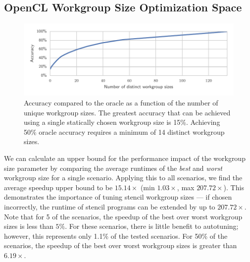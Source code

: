 \documentclass[nonatbib,preprint,nocopyrightspace,9pt]{sigplanconf}
\begin{document}
\subsection{OpenCL Workgroup Size Optimization Space}

\begin{figure}
\centering
\includegraphics[width=\columnwidth]{img/num_params_oracle.pdf}
\caption{%
  Accuracy compared to the oracle as a function of the number of
  unique workgroup sizes. The greatest accuracy that can be achieved
  using a single statically chosen workgroup size is 15\%. Achieving
  50\% oracle accuracy requires a minimum of 14 distinct workgroup
  sizes.%
}
\label{fig:oracle-accuracy}
\end{figure}

We can calculate an upper bound for the performance impact of the
workgroup size parameter by comparing the average runtimes of the
\emph{best} and \emph{worst} workgroup size for a single
scenario. Applying this to all scenarios, we find the average speedup
upper bound to be $15.14\times$ (min $1.03\times$, max
$207.72\times$). This demonstrates the importance of tuning stencil
workgroup sizes --- if chosen incorrectly, the runtime of stencil
programs can be extended by up to $207.72\times$. Note that for 5 of
the scenarios, the speedup of the best over worst workgroup sizes is
less than $5\%$. For these scenarios, there is little benefit to
autotuning; however, this represents only 1.1\% of the tested
scenarios. For 50\% of the scenarios, the speedup of the best over
worst workgroup sizes is greater than $6.19\times$.
\end{document}
